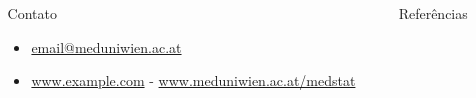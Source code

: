 \documentclass[final]{beamer}
\newlength{\sepmargin}
\newlength{\sepwid}
\newlength{\onecolwid}
\begin{document}
\begin{frame}[t]
	

	\begin{columns}[b] %

		\begin{column}{\sepmargin}
		\end{column}

		\begin{column}{\onecolwid} %

			\vspace{0pt}

			\begin{alertblock}{\large Contato}
				\begin{footnotesize}
					\begin{itemize}
						\item \href{mailto:email@meduniwien.ac.at}{email@meduniwien.ac.at}
						\item \href{http://www.example.com/}{www.example.com} - \href{www.meduniwien.ac.at/medstat}{www.meduniwien.ac.at/medstat}
					\end{itemize}
				\end{footnotesize}	
			\end{alertblock}

		
		\end{column}%

		\begin{column}{\sepwid}
		\end{column} %

		\begin{column}{\onecolwid} %

			\begin{block}{\large Referências}
				\vspace{0pt}
				\nocite{meneghessocodigos,arantes2007,rmc_wiki} %
				{\footnotesize
				}
			\end{block} 
		\vspace{0pt}
		\end{column} %

		\begin{column}{\sepmargin}
		\end{column}

	\end{columns} %

\end{frame} %
\end{document}
